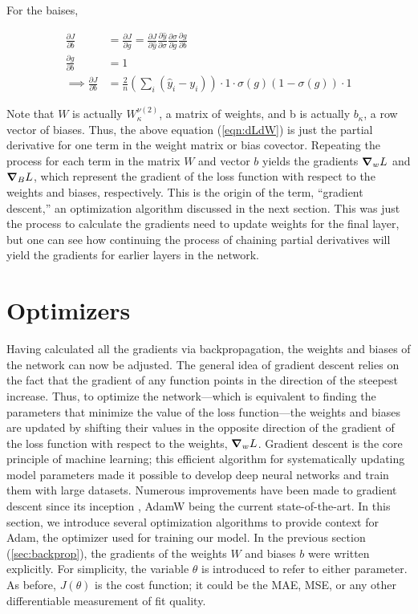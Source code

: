 \noindent For the baises,

\begin{align}
\label{eqn:dLdW}
\frac{\partial J}{\partial b} &= \frac{\partial J}{\partial g} = \frac{\partial J}{\partial \hat{y}} \frac{\partial \hat{y}}{\partial \sigma} \frac{\partial \sigma}{\partial g} \frac{\partial g}{\partial b} \\
\frac{\partial g}{\partial b} &= 1 \\
\implies \frac{\partial J}{\partial b} &= \frac{2}{n} \left( \sum_i (\hat{y}_i - y_i ) \right) \cdot 1 \cdot  \sigma(g)(1 - \sigma(g)) \cdot 1
\end{align}

Note that $ W $ is actually $ W_\kappa ^{\nu (2)} $, a matrix of weights, and b is actually $ b_\kappa $, a row vector of biases. Thus, the above equation (\ref{eqn:dLdW}) is just the partial derivative for one term in the weight matrix or bias covector. Repeating the process for each term in the matrix $ W $  and vector $ b $  yields the gradients $ \grad_w L $  and $ \grad_B L $, which represent the gradient of the loss function with respect to the weights and biases, respectively. This is the origin of the term, ``gradient descent,'' an optimization algorithm discussed in the next section. This was just the process to calculate the gradients need to update weights for the final layer, but one can see how continuing the process of chaining partial derivatives will yield the gradients for earlier layers in the network. 

\section{Optimizers} \label{sec:optimizers}
Having calculated all the gradients via backpropagation, the weights and biases of the network can now be adjusted. The general idea of gradient descent relies on the fact that the gradient of any function points in the direction of the steepest increase. Thus, to optimize the network---which is equivalent to finding the parameters that minimize the value of the loss function---the weights and biases are updated by shifting their values in the opposite direction of the gradient of the loss function with respect to the weights, $ \grad_w L $. Gradient descent is the core principle of machine learning; this efficient algorithm for systematically updating model parameters made it possible to develop deep neural networks and train them with large datasets. Numerous improvements have been made to gradient descent since its inception \cite{cauchy-orig-grad-descent}, AdamW \cite{AdamW-orig} being the current state-of-the-art. In this section, we introduce several optimization algorithms to provide context for Adam, the optimizer used for training our model. In the previous section (\ref{sec:backprop}), the gradients of the weights $ W $ and biases $ b $ were written explicitly. For simplicity, the variable $ \theta $ is introduced to refer to either parameter. As before, $ J(\theta) $  is the cost function; it could be the MAE, MSE, or any other differentiable measurement of fit quality.

